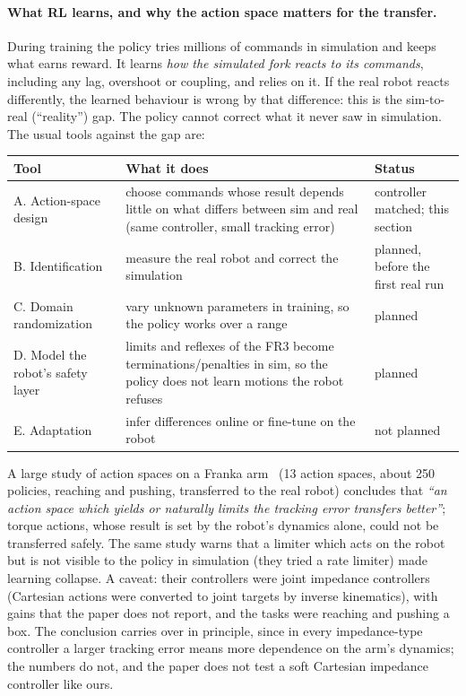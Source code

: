 \paragraph{What RL learns, and why the action space matters for the transfer.} During training the policy tries
millions of commands in simulation and keeps what earns reward. It learns \emph{how the simulated fork reacts to its
commands}, including any lag, overshoot or coupling, and relies on it. If the real robot reacts differently, the
learned behaviour is wrong by that difference: this is the sim-to-real (``reality'') gap. The policy cannot correct
what it never saw in simulation. The usual tools against the gap are:
\begin{center}
{\renewcommand{\arraystretch}{1.15}
\begin{tabular}{>{\raggedright\arraybackslash}p{}>{\raggedright\arraybackslash}p{}>{\raggedright\arraybackslash}p{}}
  \toprule
  Tool & What it does & Status \\
  \midrule
  A. Action-space design & choose commands whose result depends little on what differs between sim and real
    (same controller, small tracking error) & controller matched; this section \\
  \addlinespace
  B. Identification & measure the real robot and correct the simulation & planned, before the first real run \\
  \addlinespace
  C. Domain randomization & vary unknown parameters in training, so the policy works over a range & planned \\
  \addlinespace
  D. Model the robot's safety layer & limits and reflexes of the FR3 become terminations/penalties in sim, so the
    policy does not learn motions the robot refuses & planned \\
  \addlinespace
  E. Adaptation & infer differences online or fine-tune on the robot & not planned \\
  \bottomrule
\end{tabular}}
\end{center}
A large study of action spaces on a Franka arm~\cite{al-aljalbout2024} (13 action spaces, about 250 policies,
reaching and pushing, transferred to the real robot) concludes that \emph{``an action space which yields or
naturally limits the tracking error transfers better''}; torque actions, whose result is set by the robot's
dynamics alone, could not be transferred safely. The same study warns that a limiter which acts on the robot but is
not visible to the policy in simulation (they tried a rate limiter) made learning collapse. A caveat: their controllers were joint
impedance controllers (Cartesian actions were converted to joint targets by inverse kinematics), with gains that
the paper does not report, and the tasks were reaching and pushing a box. The conclusion carries over in principle,
since in every impedance-type controller a larger tracking error means more dependence on the arm's dynamics; the
numbers do not, and the paper does not test a soft Cartesian impedance controller like ours.

